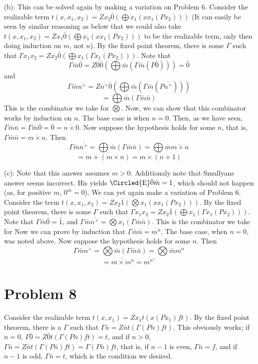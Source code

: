 \documentclass{article}
\newcommand*\circled[1]{\tikz[baseline=(char.base)]{
            \node[shape=circle,draw,inner sep=1pt] (char) {#1};}}
\theoremstyle{definition}
\begin{document}
(b): This can be solved again by making a variation on Problem 6. Consider the realizable term $t(x,x_1,x_2)=Zx_2\bar{0}(\bigoplus x_1(xx_1(Px_2)))$
(It can easily be seen by similar reasoning as below that we could also take $t(x,x_1,x_2)=Zx_1\bar{0}(\bigoplus x_1(xx_1(Px_2)))$ to be the realizable term, only then doing induction on $m$, not $n$). 
By the fixed point theorem, there is some 
$\Gamma$ such that $\Gamma x_1x_2=Zx_2\bar{0}(\bigoplus x_1(\Gamma x_1(Px_2)))$. 
Note that \[ \Gamma\bar{m}\bar{0}=Z\bar{0}\bar{0}(\bigoplus \bar{m}(\Gamma \bar{m}(P\bar{0})))=\bar{0} \] and 
\[ \Gamma\bar{m}\overline{n^+}=Z\overline{n^+}\bar{0}(\bigoplus\bar{m}(\Gamma\bar{m}(P\overline{n^+}))) \] \[ =\bigoplus\bar{m}(\Gamma\bar{m}\bar{n}) \]
This is the combinator we take for $\bigotimes$. Now, we can show that this combinator works by induction on 
$n$. The base case is when $n=0$. Then, as we have seen, $\Gamma\bar{m}\bar{n}=\Gamma\bar{m}\bar{0}=\bar{0}=\overline{n\times 0}$. Now suppose the hypothesis holds for some $n$, that is, 
$\Gamma\bar{m}\bar{n}=\overline{m\times n}$. Then \[ \Gamma\bar{m}\overline{n^+}=\bigoplus\bar{m}(\Gamma\bar{m}\bar{n})=\bigoplus\bar{m}\overline{m\times n} \] 
\[ =\overline{m+(m\times n)}=\overline{m\times (n+1)} \]


(c):\circled{\textsf{E}}
Note that this answer assumes $m>0$. Additionaly note that Smullyans answer seems incorrect. His yields $\textrm{\Circled{E}}\bar{0}\bar{m}=1$, which should not happen (as, for positive $m$, $0^m=0$). 
We can yet again make a variation of Problem 6. Consider the term $t(x,x_1,x_2)=Zx_2\bar{1}(\bigotimes x_1(xx_1(Px_2)))$. By the fixed point theorem, there is 
some $\Gamma$ such that $\Gamma x_1x_2=Zx_2\bar{1}(\bigoplus x_1(\Gamma x_1(Px_2)))$. Note that $\Gamma\bar{m}\bar{0}=\bar{1}$, and 
$\Gamma\bar{m}\overline{n^+}=\bigotimes x_1(\Gamma \bar{m}\bar{n})$. This is the combinator we take for  
Now we can prove by induction that $\Gamma\bar{m}\bar{n}=\overline{m^n}$. The base case, when $n=0$, was noted above.
Now suppose the hypothesis holds for some $n$. Then \[ \Gamma\bar{m}\overline{n^+}=\bigotimes\bar{m}(\Gamma\bar{m}\bar{n})=\bigotimes\bar{m}\overline{m^n} \]
\[ =\overline{m\times m^n}=\overline{m^{n^+}} \] 

\section*{Problem 8}
Consider the realizable term $t(x,x_1)=Zx_1t(x(Px_1)ft)$. By the fixed point theorem, there is a $\Gamma$ such that
$\Gamma\bar{n}=Z\bar{n}t(\Gamma(P\bar{n})ft)$. This obviously works; if $n=0$, $\Gamma\bar{0}=Z\bar{0}t(\Gamma(P\bar{n})ft)=t$, and if 
$n>0$, $\Gamma\bar{n}=Z\bar{n}t(\Gamma(P\bar{n})ft)=\Gamma(P\bar{n})ft$, that is, if $n-1$ is even, $\Gamma\bar{n}=f$, and if $n-1$ is odd, $\Gamma\bar{n}=t$, which is the condition we desired.
\end{document}
